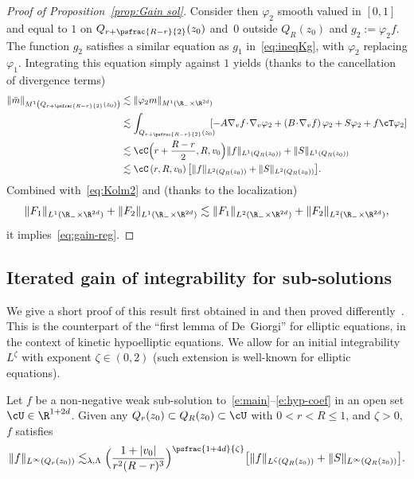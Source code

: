 \begin{proof}[Proof of Proposition~\ref{prop:Gain sol}]
Consider then $\varphi_2$ smooth valued in $[0,1]$ and equal to
$1$ on $Q_{r+\psfrac{R-r}{2}}(z_0)$ and~$0$ outside $Q_R(z_0)$
and $g_2:=\varphi_2 f$. The function $g_2$ satisfies a similar
equation as $g_1$ in~\eqref{eq:ineqKg}, with $\varphi_2$
replacing $\varphi_1$. Integrating this equation simply against
$1$ yields (thanks to the cancellation of divergence terms)
\begin{align*}
\| \bar m \|_{M^1\left(Q_{r+\psfrac{R-r}{2}}(z_0)\right)}
& \lesssim
\| \varphi_2 m \|_{M^1(\R_- \times \R^{2d})} \\
& \lesssim \int_{Q_{r+\psfrac{R-r}{2}}(z_0)}
\hspace*{-2mm}[ -A\nabla_v
f\!\cdot\! \nabla_v \varphi_2 + \left( B \!\cdot\! \nabla_v f
\right)\varphi_2 + S\varphi_2 + f \cT \varphi_2] \\
& \lesssim \cC\Bigl(r+\frac{R-r}{2},R,v_0 \Bigr) \| f
\|_{L^1(Q_R(z_0))} + \| S \|_{L^1(Q_R(z_0))}\\
& \lesssim \cC\left(r,R,v_0
\right) \bigl[ \| f \|_{L^2(Q_R(z_0))} + \| S
\|_{L^2(Q_R(z_0))} \bigr].
\end{align*}
Combined with~\eqref{eq:Kolm2} and (thanks to the localization)
\begin{align*}
\| F_1 \|_{L^1(\R_- \times \R^{2d})} + \| F_2 \|_{L^1(\R_-
\times \R^{2d})} \lesssim \| F_1 \|_{L^2(\R_- \times
\R^{2d})} + \| F_2 \|_{L^2(\R_- \times \R^{2d})},
\end{align*}
it implies~\eqref{eq:gain-reg}.
\end{proof}

\subsection{Iterated gain of integrability for sub-solutions}

We give a short proof of this result first obtained in
\cite[Th.\,1.2]{pp} and then proved
differently~\cite[Th.\,12]{gimv}. This is the counterpart of
the ``first lemma of De~Giorgi'' for elliptic equations, in the
context of kinetic hypoelliptic equations. We allow for an
initial integrability~$L^\zeta$ with exponent $\zeta \in (0,2)$
(such extension is well-known for elliptic equations).

\begin{proposition}
\label{prop:1st lemma}
Let $f$ be a non-negative weak sub-solution
to~\eqref{e:main}--\eqref{e:hyp-coef} in an open set
$\cU \in \R^{1+2d}$. Given any
$Q_r(z_0) \subset Q_R(z_0) \subset \cU$ with $0<r<R \le 1$, and
$\zeta >0$, $f$ satisfies
\begin{equation*}
\| f \|_{L^\infty(Q_r(z_0))} \lesssim_{\lambda,\Lambda}
\Bigl( \frac{1+|v_0|}{r^2(R-r)^3}\Bigr)^{\psfrac{1+4d}{\zeta}}
\bigl[ \|f\|_{L^\zeta(Q_R(z_0))} + \|S\|_{L^\infty(Q_R(z_0))} \bigr].
\end{equation*}
\end{proposition}

